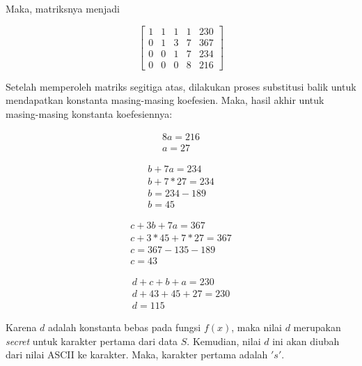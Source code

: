 Maka, matriksnya menjadi

\begin{center}
	\setlength\arraycolsep{15pt}
	\[
	\begin{bmatrix}
			1 	& 1 	& 1 	& 1 		& 230 		\\[1em]
			0 	& 1 	& 3 	& 7 		& 367			\\[1em]
			0 	& 0 	& 1 	& 7 		& 234		\\[1em]
			0 	& 0 	& 0 	& 8 		& 216
	\end{bmatrix}
	\]
\end{center}

Setelah memperoleh matriks segitiga atas, dilakukan proses substitusi balik untuk mendapatkan konstanta masing-masing koefesien. Maka, hasil akhir untuk masing-masing konstanta koefesiennya:

\begin{gather*}
	8a = 216 \\
	a = 27
\end{gather*}

\begin{gather*}
	b + 7a = 234 \\
	b + 7*27 = 234 \\
	b = 234 - 189 \\
	b = 45
\end{gather*}

\begin{gather*}
	c + 3b + 7a = 367 \\
	c + 3*45 + 7*27 = 367 \\
	c = 367 - 135 - 189 \\
	c = 43
\end{gather*}

\begin{gather*}
	d + c + b + a = 230 \\
	d + 43 + 45 + 27 = 230 \\
	d = 115
\end{gather*}

Karena \begin{math}d\end{math} adalah konstanta bebas pada fungsi \begin{math}f(x)\end{math}, maka nilai \begin{math}d\end{math} merupakan \textit{secret} untuk karakter pertama dari data \begin{math}S\end{math}. Kemudian, nilai \begin{math}d\end{math} ini akan diubah dari nilai ASCII ke karakter. Maka, karakter pertama adalah \begin{math}'s'\end{math}.

